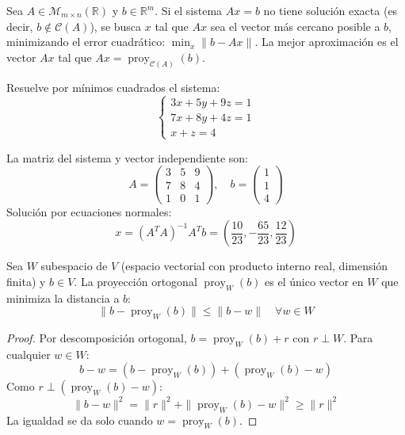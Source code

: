 \begin{definition}
Sea $A \in \mathcal{M}_{m \times n}(\mathbb{R})$ y $b \in \mathbb{R}^m$. Si el sistema $Ax = b$ no tiene solución exacta (es decir, $b \notin \mathcal{C}(A)$), se busca $x$ tal que $Ax$ sea el vector más cercano posible a $b$, minimizando el error cuadrático: \(
\min_{x} \|b - Ax\|
.\) La mejor aproximación es el vector $Ax$ tal que $Ax = \operatorname{proy}_{\mathcal{C}(A)}(b)$.
\end{definition}

\begin{example}
Resuelve por mínimos cuadrados el sistema:
\[
\begin{cases}
3x + 5y + 9z = 1 \\
7x + 8y + 4z = 1 \\
x + z = 4
\end{cases}
\]
\begin{myproof}
La matriz del sistema y vector independiente son:
\[
A = \begin{pmatrix}
3 & 5 & 9 \\
7 & 8 & 4 \\
1 & 0 & 1
\end{pmatrix}, \quad
b = \begin{pmatrix} 1 \\ 1 \\ 4 \end{pmatrix}
\]
Solución por ecuaciones normales:
\[
x = (A^T A)^{-1} A^T b = \left( \frac{10}{23}, -\frac{65}{23}, \frac{12}{23} \right)
\]
\end{myproof}
\end{example}

\begin{theorem}
Sea $W$ subespacio de $V$ (espacio vectorial con producto interno real, dimensión finita) y $b \in V$. La proyección ortogonal $\operatorname{proy}_W(b)$ es el único vector en $W$ que minimiza la distancia a $b$:
\[
\|b - \operatorname{proy}_W(b)\| \leq \|b - w\| \quad \forall w \in W
\]
\begin{proof}
Por descomposición ortogonal, $b = \operatorname{proy}_W(b) + r$ con $r \perp W$. Para cualquier $w \in W$:
\[
b - w = (b - \operatorname{proy}_W(b)) + (\operatorname{proy}_W(b) - w)
\]
Como $r \perp (\operatorname{proy}_W(b) - w)$:
\[
\|b - w\|^2 = \|r\|^2 + \|\operatorname{proy}_W(b) - w\|^2 \geq \|r\|^2
\]
La igualdad se da solo cuando $w = \operatorname{proy}_W(b)$.
\end{proof}
\end{theorem}

